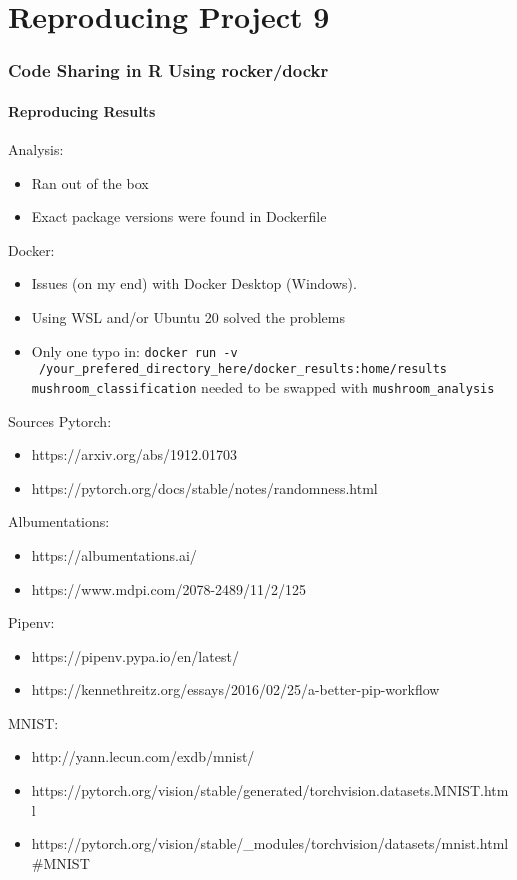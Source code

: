 \documentclass{beamer}
\begin{document}
\section{Reproducing Project 9}
\begin{frame}
\frametitle{Code Sharing in R Using rocker/dockr}
\framesubtitle{Reproducing Results}
Analysis:
\begin{itemize}
    \item Ran out of the box 
    \item Exact package versions were found in Dockerfile
\end{itemize}
\medskip
Docker: 
\begin{itemize}
    \item Issues (on my end) with Docker Desktop (Windows).
    \item Using WSL and/or Ubuntu 20 solved the problems
    \item Only one typo in: \texttt{docker run -v ~/your\_prefered\_directory\_here/docker\_results:home/results mushroom\_classification} needed to be swapped with \texttt{mushroom\_analysis} 
\end{itemize}
\end{frame}


\begin{frame}{Sources}
Pytorch:
\begin{itemize}
    \item \tiny https://arxiv.org/abs/1912.01703
    \item \tiny https://pytorch.org/docs/stable/notes/randomness.html\\
\end{itemize}
Albumentations:
\begin{itemize}
    \item \tiny https://albumentations.ai/\\
    \item \tiny https://www.mdpi.com/2078-2489/11/2/125\\
\end{itemize}
Pipenv:
\begin{itemize}
    \item \tiny https://pipenv.pypa.io/en/latest/
    \item \tiny https://kennethreitz.org/essays/2016/02/25/a-better-pip-workflow
\end{itemize}
MNIST:
\begin{itemize}
    \item \tiny http://yann.lecun.com/exdb/mnist/
    \item \tiny https://pytorch.org/vision/stable/generated/torchvision.datasets.MNIST.html
    \item \tiny https://pytorch.org/vision/stable/\_modules/torchvision/datasets/mnist.html\#MNIST
\end{itemize}



\end{frame}
\end{document}
